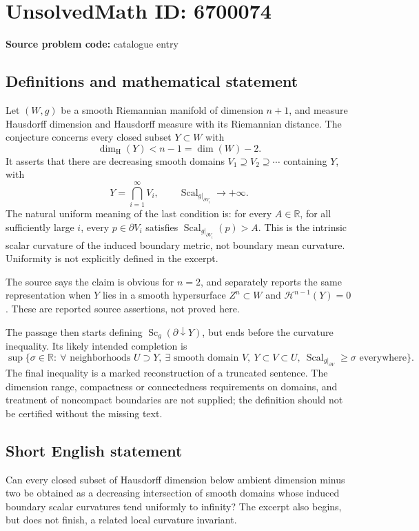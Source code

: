 \documentclass[11pt]{article}
\newcommand{\R}{\mathbb{R}}
\begin{document}
\section*{UnsolvedMath ID: 6700074}
\textbf{Source problem code:} catalogue entry
\subsection{Definitions and mathematical statement}
Let \((W,g)\) be a smooth Riemannian manifold of dimension \(n+1\), and measure Hausdorff dimension and Hausdorff measure with its Riemannian distance. The conjecture concerns every closed subset \(Y\subset W\) with
\[
 \dim_{\mathrm H}(Y)<n-1=\dim(W)-2.
\]
It asserts that there are decreasing smooth domains \(V_1\supseteq V_2\supseteq\cdots\) containing \(Y\), with
\[
 Y=\bigcap_{i=1}^{\infty}V_i,\qquad
 \operatorname{Scal}_{g|_{\partial V_i}}\longrightarrow+\infty.
\]
The natural uniform meaning of the last condition is: for every \(A\in\R\), for all sufficiently large \(i\), every \(p\in\partial V_i\) satisfies \(\operatorname{Scal}_{g|_{\partial V_i}}(p)>A\). This is the intrinsic scalar curvature of the induced boundary metric, not boundary mean curvature. Uniformity is not explicitly defined in the excerpt.

The source says the claim is obvious for \(n=2\), and separately reports the same representation when \(Y\) lies in a smooth hypersurface \(Z^n\subset W\) and \(\mathcal H^{n-1}(Y)=0\). These are reported source assertions, not proved here.

The passage then starts defining \(\operatorname{Sc}_g(\partial\downarrow Y)\), but ends before the curvature inequality. Its likely intended completion is
\[
 \sup\{\sigma\in\R:\ \forall\text{ neighborhoods }U\supset Y,\ \exists\text{ smooth domain }V,
 \ Y\subset V\subset U,\ \operatorname{Scal}_{g|_{\partial V}}\geq\sigma\text{ everywhere}\}.
\]
The final inequality is a marked reconstruction of a truncated sentence. The dimension range, compactness or connectedness requirements on domains, and treatment of noncompact boundaries are not supplied; the definition should not be certified without the missing text.
\subsection{Short English statement}
Can every closed subset of Hausdorff dimension below ambient dimension minus two be obtained as a decreasing intersection of smooth domains whose induced boundary scalar curvatures tend uniformly to infinity? The excerpt also begins, but does not finish, a related local curvature invariant.
\end{document}
